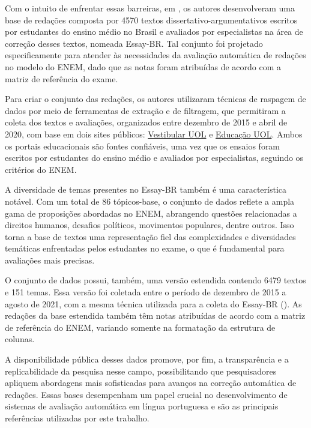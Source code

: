 Com o intuito de enfrentar essas barreiras, em \cite{marinho-et-al-21}, os autores desenvolveram uma base de redações composta por 4570 textos dissertativo-argumentativos escritos por estudantes do ensino médio no Brasil e avaliados por especialistas na área de correção desses textos, nomeada Essay-BR. Tal conjunto foi projetado especificamente para atender às necessidades da avaliação automática de redações no modelo do ENEM, dado que as notas foram atribuídas de acordo com a matriz de referência do exame.

Para criar o conjunto das redações, os autores utilizaram técnicas de raspagem de dados por meio de ferramentas de extração e de filtragem, que permitiram a coleta dos textos e avaliações, organizados entre dezembro de 2015 e abril de 2020, com base em dois sites públicos: \href{https://vestibular.brasilescola.uol.com.br/banco-de-redacoes}{Vestibular UOL} e \href{https://educacao.uol.com.br/bancoderedacoes}{Educação UOL}. Ambos os portais educacionais são fontes confiáveis, uma vez que os ensaios foram escritos por estudantes do ensino médio e avaliados por especialistas, seguindo os critérios do ENEM.

A diversidade de temas presentes no Essay-BR também é uma característica notável. Com um total de 86 tópicos-base, o conjunto de dados reflete a ampla gama de proposições abordadas no ENEM, abrangendo questões relacionadas a direitos humanos, desafios políticos, movimentos populares, dentre outros. Isso torna a base de textos uma representação fiel das complexidades e diversidades temáticas enfrentadas pelos estudantes no exame, o que é fundamental para avaliações mais precisas.

O conjunto de dados possui, também, uma versão estendida contendo 6479 textos e 151 temas. Essa versão foi coletada entre o período de dezembro de 2015 a agosto de 2021, com a mesma técnica utilizada para a coleta do Essay-BR (\cite{marinho-et-al-22}). As redações da base estendida também têm notas atribuídas de acordo com a matriz de referência do ENEM, variando somente na formatação da estrutura de colunas.

A disponibilidade pública desses dados promove, por fim, a transparência e a replicabilidade da pesquisa nesse campo, possibilitando que pesquisadores apliquem abordagens mais sofisticadas para avanços na correção automática de redações. Essas bases desempenham um papel crucial no desenvolvimento de sistemas de avaliação automática em língua portuguesa e são as principais referências utilizadas por este trabalho.

